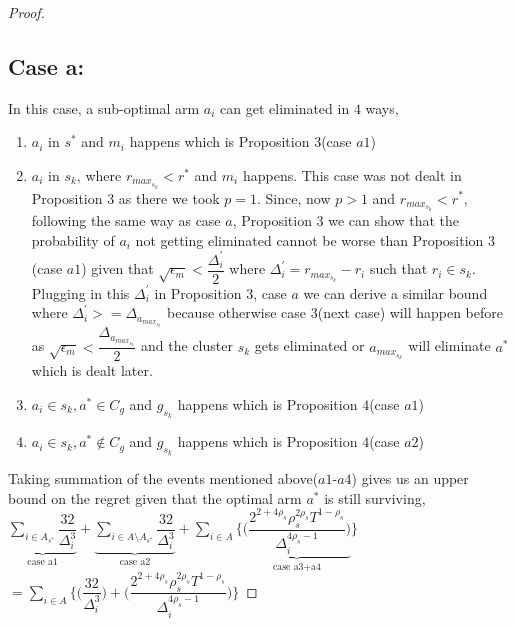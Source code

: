\begin{proof}
\subsection{Case a:} 
In this case, a sub-optimal arm $a_{i}$ can get eliminated in $4$ ways,
\begin{enumerate}[1]
\item $a_{i}$ in $s^{*}$ and $m_{i}$ happens which is Proposition $3$(case $a1$)
\item $a_{i}$ in $s_{k}$, where $r_{max_{s_{k}}}< r^{*}$ and $m_{i}$ happens. This case was not dealt in Proposition $3$ as there we took $p=1$. Since, now $p>1$ and $r_{max_{s_{k}}}< r^{*}$, following the same way as case $a$, Proposition $3$ we can show that the probability of $a_{i}$ not getting eliminated  cannot be worse than Proposition $3$(case $a1$) given that $\sqrt{\epsilon_{m}}< \dfrac{\Delta^{'}_{i}}{2}$ where $\Delta^{'}_{i}=r_{max_{s_{k}}} - r_{i}$ such that $r_{i}\in s_{k}$. Plugging in this $\Delta^{'}_{i}$ in Proposition $3$, case $a$ we can derive a similar bound where $\Delta^{'}_{i}>=\Delta_{a_{max_{s_{k}}}}$ because otherwise case $3$(next case) will happen before as $\sqrt{\epsilon_{m}}< \dfrac{\Delta_{a_{max_{s_{k}}}}}{2}$ and the cluster $s_{k}$ gets eliminated or $a_{max_{s_{k}}}$ will eliminate $a^{*}$ which is dealt later.
\item $a_{i}\in s_{k}, a^{*}\in C_{g}$ and $g_{s_{k}}$ happens which is Proposition $4$(case $a1$)
\item $a_{i}\in s_{k}, a^{*}\notin C_{g}$ and $g_{s_{k}}$ happens which is Proposition $4$(case $a2$)
\end{enumerate}
Taking summation of the events mentioned above($a1$-$a4$) gives us an upper bound on the regret given that the optimal arm $a^{*}$ is still surviving, 
\newline
$ \underbrace{\sum_{i\in A_{s^{*}}}\dfrac{32}{\Delta_{i}^{3}}}_{\text{case a1}} + \underbrace{\sum_{i\in A\setminus A_{s^{*}}}\dfrac{32}{\Delta_{i}^{3}}}_{\text{case a2}} + \sum_{i\in A}\bigg\lbrace \underbrace{\bigg(\dfrac{2^{2+4\rho_{s}}\rho_{s}^{2\rho_{s}}T^{1-\rho_{s}}}{\Delta_{i}^{4\rho_{s}-1}}\bigg)}_{\text{case a3+a4}}\bigg\rbrace $ 
\newline
$= \sum_{i\in A}\bigg\lbrace \bigg(\dfrac{32}{\Delta_{i}^{3}}\bigg) + \bigg(\dfrac{2^{2+4\rho_{s}}\rho_{s}^{2\rho_{s}}T^{1-\rho_{s}}}{\Delta_{i}^{4\rho_{s}-1}}\bigg)\bigg\rbrace$

\end{proof}
